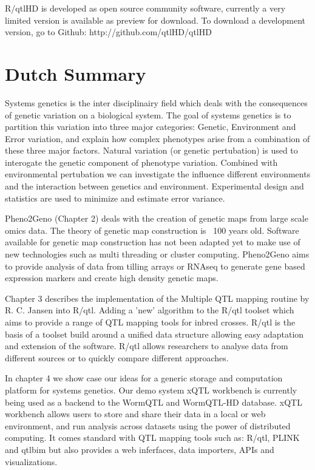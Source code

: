 R/qtlHD is developed as open source community software, currently a very limited version is available as preview for
download. To download a development version, go to Github: http://github.com/qtlHD/qtlHD

\newpage

\section*{Dutch Summary}
Systems genetics is the inter disciplinairy field which deals with the consequences of genetic 
variation on a biological system. The goal of systems genetics is to partition this variation 
into three major categories: Genetic, Environment and Error variation, and explain how complex
phenotypes arise from a combination of these three major factors.  Natural variation (or 
genetic pertubation) is used to interogate the genetic component of phenotype variation. 
Combined with environmental pertubation we can investigate the influence different 
environments and the interaction between genetics and environment. Experimental design and 
statistics are used to minimize and estimate error variance.

Pheno2Geno (Chapter 2) deals with the creation of genetic maps from large scale omics data. 
The theory of genetic map construction is ~100 years old. Software available for genetic map 
construction has not been adapted yet to make use of new technologies such as multi threading 
or cluster computing. Pheno2Geno aims to provide analysis of data from tilling arrays or RNAseq 
to generate gene based expression markers and create high density genetic maps.

Chapter 3 describes the implementation of the Multiple QTL mapping routine by R. C. Jansen into 
R/qtl. Adding a 'new' algorithm to the R/qtl toolset which aims to provide a range of QTL 
mapping tools for inbred crosses. R/qtl is the basis of a toolset build around a unified 
data structure allowing easy adaptation and extension of the software. R/qtl allows researchers 
to analyse data from different sources or to quickly compare different approaches.

In chapter 4 we show case our ideas for a generic storage and computation platform for systems 
genetics. Our demo system xQTL workbench is currently being used as a backend to the 
WormQTL and WormQTL-HD database. xQTL workbench allows users to store and share their data in 
a local or web environment, and run analysis across datasets using the power of distributed 
computing. It comes standard with QTL mapping tools such as: R/qtl, PLINK and qtlbim but also
provides a web inferfaces, data importers, APIs and visualizations.

